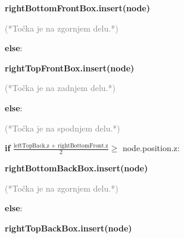 \documentclass[fleqn]{article}
\begin{document}
\hspace{4cm} \textbf{rightBottomFrontBox.insert(node)}

\vspace{2mm}
\hspace{3cm} \textcolor{gray}{(*Točka je na zgornjem delu.*)} 

\vspace{2mm}
\hspace{3cm}  \textbf{else}: 

\hspace{4cm} \textbf{rightTopFrontBox.insert(node)}

\vspace{2mm}
\hspace{2cm} \textcolor{gray}{(*Točka je na zadnjem delu.*)} 

\vspace{2mm}
\hspace{2cm}  \textbf{else}: 


\vspace{2mm}
\hspace{3cm} \textcolor{gray}{(*Točka je na spodnjem delu.*)} 

\vspace{2mm}
\hspace{3cm}  \textbf{if} $\frac{\text{leftTopBack.z + rightBottomFront.z}}{2} \geq$ node.position.z:

\hspace{4cm} \textbf{rightBottomBackBox.insert(node)}

\vspace{2mm}
\hspace{3cm} \textcolor{gray}{(*Točka je na zgornjem delu.*)} 

\vspace{2mm}
\hspace{3cm}  \textbf{else}: 

\hspace{4cm} \textbf{rightTopBackBox.insert(node)}
\end{document}
